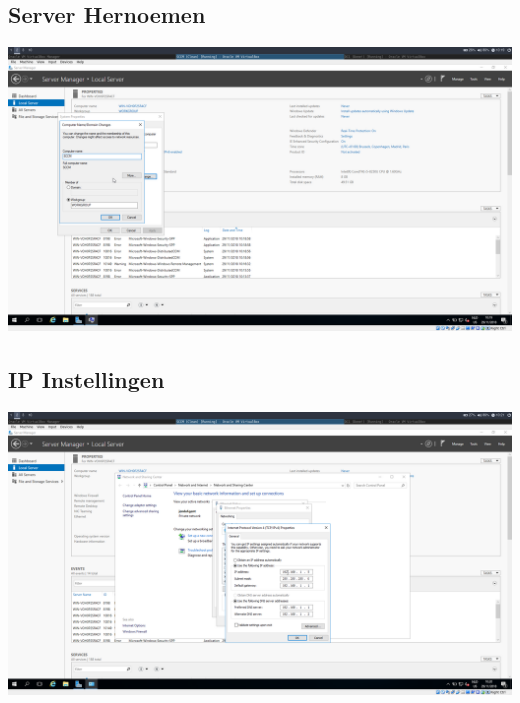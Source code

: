 \documentclass[a4paper]{article}
\begin{document}
\subsection{Server Hernoemen}
\begin{center}
	\includegraphics[width=15cm]{Pictures/SCCM/0/1543483191.png}
\end{center}
\subsection{IP Instellingen}
\begin{center}
	\includegraphics[width=15cm]{Pictures/SCCM/0/1543483265.png}
\end{center}
\end{document}
